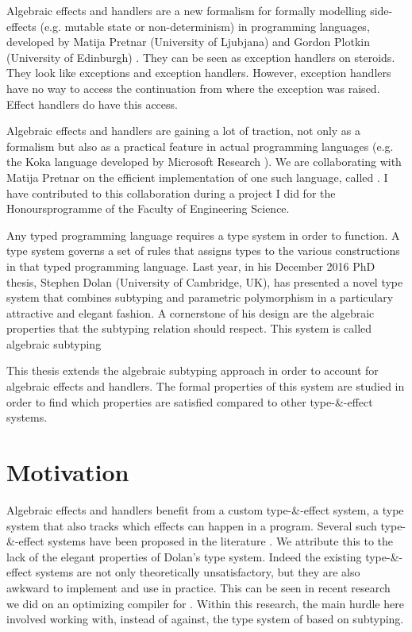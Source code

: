 Algebraic effects and handlers are a new formalism for formally modelling side-effects (e.g. mutable state or non-determinism) in programming languages, developed by Matija Pretnar (University of Ljubjana) and Gordon Plotkin (University of Edinburgh) \cite{DBLP:conf/lics/PlotkinP08,handling}. They can be seen as exception handlers on steroids. They look like exceptions and exception handlers. However, exception handlers have no way to access the continuation from where the exception was raised. Effect handlers do have this access. 

Algebraic effects and handlers are gaining a lot of traction, not only as a formalism but also as a practical feature in actual programming languages (e.g. the Koka language developed by Microsoft Research \cite{leijen2014koka}). We are collaborating with Matija Pretnar on the efficient implementation of one such language, called \eff. I have contributed to this collaboration during a project I did for the Honoursprogramme of the Faculty of Engineering Science.

Any typed programming language requires a type system in order to function. A type system governs a set of rules that assigns types to the various constructions in that typed programming language. Last year, in his December 2016 PhD thesis, Stephen Dolan (University of Cambridge, UK), has presented a novel type system that combines subtyping and parametric polymorphism in a particulary attractive and elegant fashion. A cornerstone of his design are the algebraic properties that the subtyping relation should respect. This system is called algebraic subtyping\cite{mlsub}

This thesis extends the algebraic subtyping approach in order to account for algebraic effects and handlers. The formal properties of this system are studied in order to find which properties are satisfied compared to other type-\&-effect systems. 

\section{Motivation}
Algebraic effects and handlers benefit from a custom type-\&-effect system, a type system that also tracks which effects can happen in a program. Several such type-\&-effect systems have been proposed in the literature \cite{leijen2014koka,handling,effectsystem}. We attribute this to the lack of the elegant properties of Dolan's type system. Indeed the existing type-\&-effect systems are not only theoretically unsatisfactory, but they are also awkward to implement and use in practice. This can be seen in recent research we did on an optimizing compiler for \eff \cite{optimization}. Within this research, the main hurdle here involved working with, instead of against, the type system of \eff based on subtyping. 

